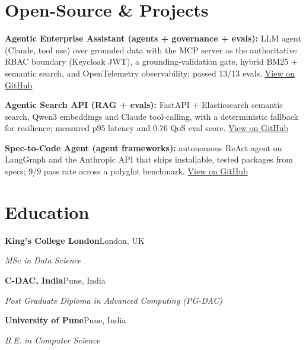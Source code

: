 \documentclass[10pt,a4paper]{article}
\begin{document}
\section{Open-Source \& Projects}
\begin{tight}
  \item \textbf{Agentic Enterprise Assistant (agents + governance + evals):} LLM agent (Claude, tool use) over grounded data with the MCP server as the authoritative RBAC boundary (Keycloak JWT), a grounding-validation gate, hybrid BM25 + semantic search, and OpenTelemetry observability; passed 13/13 evals. \href{https://github.com/abhijeetscode/Agentic-Enterprise-Assistant}{View on GitHub}
  \item \textbf{Agentic Search API (RAG + evals):} FastAPI + Elasticsearch semantic search, Qwen3 embeddings and Claude tool-calling, with a deterministic fallback for resilience; measured p95 latency and 0.76 QoS eval score. \href{https://github.com/abhijeetscode/search-agent}{View on GitHub}
  \item \textbf{Spec-to-Code Agent (agent frameworks):} autonomous ReAct agent on LangGraph and the Anthropic API that ships installable, tested packages from specs; 9/9 pass rate across a polyglot benchmark. \href{https://github.com/abhijeetscode/Spec-to-Code-Agent}{View on GitHub}
\end{tight}

\section{Education}
{\color{company}\bfseries King's College London}\hfill {\color{muted}London, UK}\par
{\itshape MSc in Data Science}\par\vspace{2pt}
{\color{company}\bfseries C-DAC, India}\hfill {\color{muted}Pune, India}\par
{\itshape Post Graduate Diploma in Advanced Computing (PG-DAC)}\par\vspace{2pt}
{\color{company}\bfseries University of Pune}\hfill {\color{muted}Pune, India}\par
{\itshape B.E. in Computer Science}\par
\end{document}
